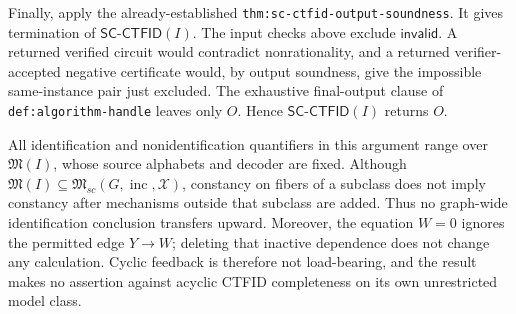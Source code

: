 Finally, apply the already-established \texttt{thm:sc-ctfid-output-soundness}.  It gives termination of \(\mathsf{SC\mbox{-}CTFID}(I)\).  The input checks above exclude \(\mathsf{invalid}\).  A returned verified circuit would contradict nonrationality, and a returned verifier-accepted negative certificate would, by output soundness, give the impossible same-instance pair just excluded.  The exhaustive final-output clause of \texttt{def:algorithm-handle} leaves only \(O\).  Hence \(\mathsf{SC\mbox{-}CTFID}(I)\) returns \(O\).

All identification and nonidentification quantifiers in this argument range over \(\mathfrak M(I)\), whose source alphabets and decoder are fixed.  Although \(\mathfrak M(I)\subseteq\mathfrak M_{sc}(G,\operatorname{inc},\mathcal X)\), constancy on fibers of a subclass does not imply constancy after mechanisms outside that subclass are added.  Thus no graph-wide identification conclusion transfers upward.  Moreover, the equation \(W=0\) ignores the permitted edge \(Y\to W\); deleting that inactive dependence does not change any calculation.  Cyclic feedback is therefore not load-bearing, and the result makes no assertion against acyclic CTFID completeness on its own unrestricted model class.
